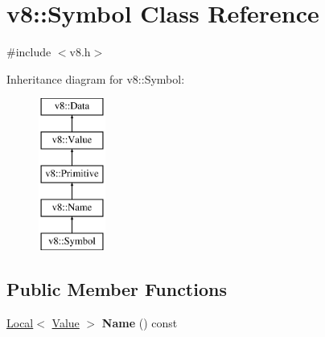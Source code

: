 \hypertarget{classv8_1_1Symbol}{}\section{v8\+:\+:Symbol Class Reference}
\label{classv8_1_1Symbol}


{\ttfamily \#include $<$v8.\+h$>$}

Inheritance diagram for v8\+:\+:Symbol\+:\begin{figure}[H]
\begin{center}
\leavevmode
\includegraphics[height=5.000000cm]{classv8_1_1Symbol}
\end{center}
\end{figure}
\subsection*{Public Member Functions}
\begin{DoxyCompactItemize}
\item 
\hypertarget{classv8_1_1Symbol_af1c1ccf079ac99e0db858c30e6458587}{}\hyperlink{classv8_1_1Local}{Local}$<$ \hyperlink{classv8_1_1Value}{Value} $>$ {\bfseries Name} () const \label{classv8_1_1Symbol_af1c1ccf079ac99e0db858c30e6458587}

\end{DoxyCompactItemize}
